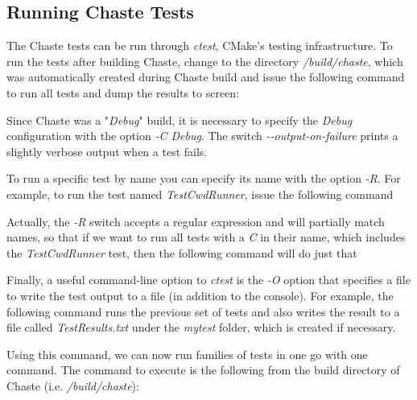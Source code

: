 \documentclass[10pt,a4paper]{article}
\begin{document}
\subsection{Running Chaste Tests}
The Chaste tests can be run through \textit{ctest}, CMake's testing
infrastructure. To run the tests after building Chaste, change to the directory
\winbuild\textit{/build/chaste}, which was automatically created during Chaste
build and issue the following command to run all tests and dump the results to
screen:
\begin{center}
\end{center}
Since Chaste was a "\textit{Debug}" build, it is necessary to specify the
\textit{Debug} configuration with the option \textit{-C Debug}. The switch
\textit{{-}-output-on-failure} prints a slightly verbose output when a test
fails.

To run a specific test by name you can specify its name with the option
\textit{-R}. For example, to run the test named \textit{TestCwdRunner}, issue
the following command

\begin{center}
\end{center}

Actually, the \textit{-R} switch accepts a regular expression and will partially
match names, so that if we want to run all tests with a \textit{C} in their
name, which includes the \textit{TestCwdRunner} test, then the following command
will do just that

\begin{center}
\end{center}

Finally, a useful command-line option to \textit{ctest} is the \textit{-O}
option that specifies a file to write the test output to a file (in addition to
the console). For example, the following command runs the previous set of tests
and also writes the result to a file called \textit{TestResults.txt} under the
\textit{mytest} folder, which is created if necessary.

\begin{center}
\end{center}

Using this command, we can now run families of tests in one go with one command.
The command to execute is the following from the build directory of Chaste (i.e.
\textit{\winbuild/build/chaste}):
\end{document}
